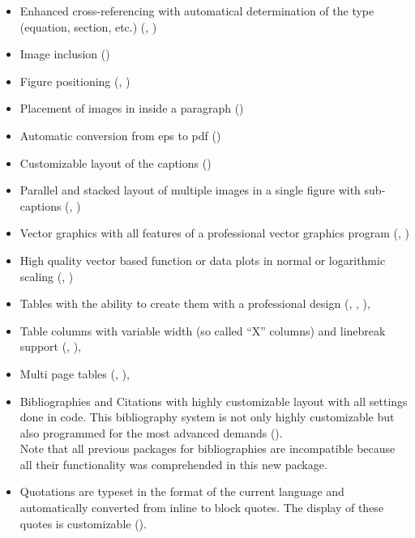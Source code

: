 \begin{itemize}
\item Enhanced cross-referencing with automatical determination of the type  (equation, section, etc.) (, )
\end{itemize}


\begin{itemize}
%
\item Image inclusion ()
\item Figure positioning (, )
\item Placement of images in inside a paragraph ()
\item Automatic conversion from eps to pdf ()
\item Customizable layout of the captions ()
\item Parallel and stacked layout of multiple images in a single figure with sub-captions (, )
%
\end{itemize}

\begin{itemize}
\item Vector graphics with all features of a professional vector graphics program (, )
%
\item High quality vector based function or data plots in normal or 
logarithmic scaling (, )
\end{itemize}


\begin{itemize}
\item Tables with the ability to create them with a professional design (, , ),
%
\item Table columns with variable width (so called \enquote{X} columns) and linebreak support (, ),
%
\item Multi page tables (, ),
\end{itemize}

\begin{itemize}
\item Bibliographies and Citations with highly customizable layout with all settings done in \latex code. This bibliography system is not only highly customizable but also programmed for the most advanced demands (). \\ 
Note that all previous packages for bibliographies are incompatible because all their functionality was comprehended in this new package. 
%
\item Quotations are typeset in the format of the current language and automatically converted from inline to block quotes. The display of these quotes is customizable ().  
\end{itemize}

